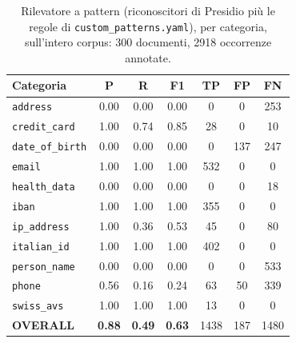 \begin{table}
	\centering
	\caption{Rilevatore a pattern (riconoscitori di Presidio più le regole di \texttt{custom\_patterns.yaml}), per categoria, sull'intero corpus: 300 documenti, 2918 occorrenze annotate.}
	\label{tab:test-pattern}
	\small
	\begin{tabular}{|l|c|c|c|c|c|c|}
		\hline
		\textbf{Categoria}       & \textbf{P}    & \textbf{R}    & \textbf{F1}   & \textbf{TP} & \textbf{FP} & \textbf{FN} \\
		\hline
		\texttt{address}         & 0.00          & 0.00          & 0.00          & 0           & 0           & 253         \\
		\hline
		\texttt{credit\_card}    & 1.00          & 0.74          & 0.85          & 28          & 0           & 10          \\
		\hline
		\texttt{date\_of\_birth} & 0.00          & 0.00          & 0.00          & 0           & 137         & 247         \\
		\hline
		\texttt{email}           & 1.00          & 1.00          & 1.00          & 532         & 0           & 0           \\
		\hline
		\texttt{health\_data}    & 0.00          & 0.00          & 0.00          & 0           & 0           & 18          \\
		\hline
		\texttt{iban}            & 1.00          & 1.00          & 1.00          & 355         & 0           & 0           \\
		\hline
		\texttt{ip\_address}     & 1.00          & 0.36          & 0.53          & 45          & 0           & 80          \\
		\hline
		\texttt{italian\_id}     & 1.00          & 1.00          & 1.00          & 402         & 0           & 0           \\
		\hline
		\texttt{person\_name}    & 0.00          & 0.00          & 0.00          & 0           & 0           & 533         \\
		\hline
		\texttt{phone}           & 0.56          & 0.16          & 0.24          & 63          & 50          & 339         \\
		\hline
		\texttt{swiss\_avs}      & 1.00          & 1.00          & 1.00          & 13          & 0           & 0           \\
		\hline
		\textbf{OVERALL}         & \textbf{0.88} & \textbf{0.49} & \textbf{0.63} & 1438        & 187         & 1480        \\
		\hline
	\end{tabular}
\end{table}

